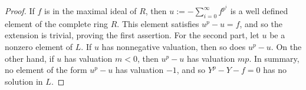 \documentclass[10pt,a4paper]{amsart}
\begin{document}
\begin{proof}
If $f$ is in the maximal ideal of $R$, then $u:=-\sum\limits_{i=0}^\infty f^{p^i}$ is a well defined element of the complete ring $R$. This element satisfies $u^p-u=f$, and so the extension is trivial, proving the first assertion. 
For the second part, let $u$ be a nonzero element of $L$. If $u$ has nonnegative valuation, then so does $u^p-u$. On the other hand, if $u$ has valuation $m<0$, then $u^p-u$ has valuation $mp$. In summary, no element of the form $u^p-u$ has valuation $-1$, and so $Y^p-Y-f=0$ has no solution in $L$.
\end{proof}
\end{document}
